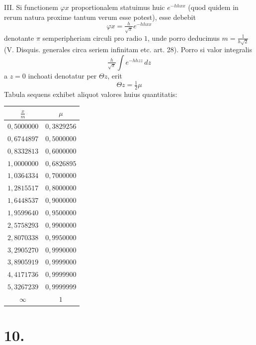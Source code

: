 \documentclass[12pt,a4paper]{book}
\begin{document}
\textsc{III.} Si functionem $\varphi x$ proportionalem statuimus huic $e^{-hhxx}$ (quod quidem in rerum natura proxime tantum verum esse potest), esse debebit
%
\begin{equation*}
\varphi x = \tfrac{h}{\sqrt{\pi}}e^{-hhxx}
\end{equation*}
denotante $\pi$ semperipheriam circuli pro radio $1$, unde porro deducimus $m=\tfrac{1}{h\sqrt{2}}$ (V. Disquis. generales circa seriem infinitam etc. art. 28). Porro si valor integralis
%
\begin{equation*}
\tfrac{h}{\sqrt{\pi}}\int e^{-hhzz}\,dz
\end{equation*}
a $z=0$ inchoati denotatur per $\Theta z$, erit
%
\begin{equation*}
\Theta z = \tfrac{1}{2}\mu
\end{equation*}
Tabula sequens exhibet aliquot valores huius quantitatis:

\begin{center}
\begin{tabular}{c|c}
\toprule
$\tfrac{x}{m}$ & $\mu$ \\
\midrule
$0{,}5000000$ & $0{,}3829256$ \\
$0{,}6744897$ & $0{,}5000000$ \\
$0{,}8332813$ & $0{,}6000000$ \\
$1{,}0000000$ & $0{,}6826895$ \\
$1{,}0364334$ & $0{,}7000000$ \\
$1{,}2815517$ & $0{,}8000000$ \\
$1{,}6448537$ & $0{,}9000000$ \\
$1{,}9599640$ & $0{,}9500000$ \\
$2{,}5758293$ & $0{,}9900000$ \\
$2{,}8070338$ & $0{,}9950000$ \\
$3{,}2905270$ & $0{,}9990000$ \\
$3{,}8905919$ & $0{,}9999000$ \\
$4{,}4171736$ & $0{,}9999900$ \\
$5{,}3267239$ & $0{,}9999999$ \\
$\infty$ & $1$ \\
\bottomrule
\end{tabular}
\end{center}

\section*{10.}
\label{sec:art10}
\end{document}
